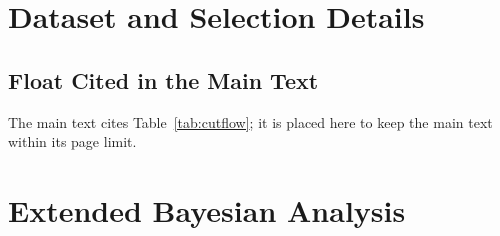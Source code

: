 \section{Dataset and Selection Details}
\label{app:ext_data}
\clearpage
\subsection{Float Cited in the Main Text}
The main text cites Table~\ref{tab:cutflow}; it is placed here to keep the main text within its page limit.

\begin{table}[h]
\centering
{}
\caption{Number of candidates passing each requirement alone and after the cumulative selection, in the order of the table, and by magnet polarity. The kaon-identification requirement on the three tracks is by far the most selective.}
\label{tab:cutflow}
\end{table}


\FloatBarrier


\section{Extended Bayesian Analysis}
\label{app:ext_bayes}
